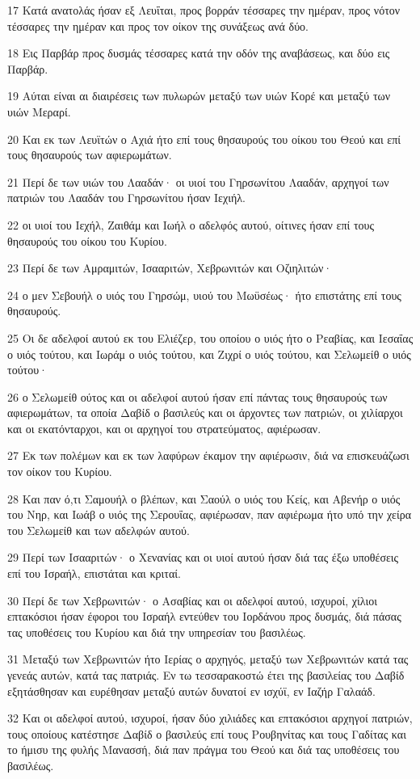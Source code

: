 \par 17 Κατά ανατολάς ήσαν εξ Λευΐται, προς βορράν τέσσαρες την ημέραν, προς νότον τέσσαρες την ημέραν και προς τον οίκον της συνάξεως ανά δύο.
\par 18 Εις Παρβάρ προς δυσμάς τέσσαρες κατά την οδόν της αναβάσεως, και δύο εις Παρβάρ.
\par 19 Αύται είναι αι διαιρέσεις των πυλωρών μεταξύ των υιών Κορέ και μεταξύ των υιών Μεραρί.
\par 20 Και εκ των Λευϊτών ο Αχιά ήτο επί τους θησαυρούς του οίκου του Θεού και επί τους θησαυρούς των αφιερωμάτων.
\par 21 Περί δε των υιών του Λααδάν· οι υιοί του Γηρσωνίτου Λααδάν, αρχηγοί των πατριών του Λααδάν του Γηρσωνίτου ήσαν Ιεχιήλ.
\par 22 οι υιοί του Ιεχήλ, Ζαιθάμ και Ιωήλ ο αδελφός αυτού, οίτινες ήσαν επί τους θησαυρούς του οίκου του Κυρίου.
\par 23 Περί δε των Αμραμιτών, Ισααριτών, Χεβρωνιτών και Οζιηλιτών·
\par 24 ο μεν Σεβουήλ ο υιός του Γηρσώμ, υιού του Μωϋσέως· ήτο επιστάτης επί τους θησαυρούς.
\par 25 Οι δε αδελφοί αυτού εκ του Ελιέζερ, του οποίου ο υιός ήτο ο Ρεαβίας, και Ιεσαΐας ο υιός τούτου, και Ιωράμ ο υιός τούτου, και Ζιχρί ο υιός τούτου, και Σελωμείθ ο υιός τούτου·
\par 26 ο Σελωμείθ ούτος και οι αδελφοί αυτού ήσαν επί πάντας τους θησαυρούς των αφιερωμάτων, τα οποία Δαβίδ ο βασιλεύς και οι άρχοντες των πατριών, οι χιλίαρχοι και οι εκατόνταρχοι, και οι αρχηγοί του στρατεύματος, αφιέρωσαν.
\par 27 Εκ των πολέμων και εκ των λαφύρων έκαμον την αφιέρωσιν, διά να επισκευάζωσι τον οίκον του Κυρίου.
\par 28 Και παν ό,τι Σαμουήλ ο βλέπων, και Σαούλ ο υιός του Κείς, και Αβενήρ ο υιός του Νηρ, και Ιωάβ ο υιός της Σερουΐας, αφιέρωσαν, παν αφιέρωμα ήτο υπό την χείρα του Σελωμείθ και των αδελφών αυτού.
\par 29 Περί των Ισααριτών· ο Χενανίας και οι υιοί αυτού ήσαν διά τας έξω υποθέσεις επί του Ισραήλ, επιστάται και κριταί.
\par 30 Περί δε των Χεβρωνιτών· ο Ασαβίας και οι αδελφοί αυτού, ισχυροί, χίλιοι επτακόσιοι ήσαν έφοροι του Ισραήλ εντεύθεν του Ιορδάνου προς δυσμάς, διά πάσας τας υποθέσεις του Κυρίου και διά την υπηρεσίαν του βασιλέως.
\par 31 Μεταξύ των Χεβρωνιτών ήτο Ιερίας ο αρχηγός, μεταξύ των Χεβρωνιτών κατά τας γενεάς αυτών, κατά τας πατριάς. Εν τω τεσσαρακοστώ έτει της βασιλείας του Δαβίδ εξητάσθησαν και ευρέθησαν μεταξύ αυτών δυνατοί εν ισχύϊ, εν Ιαζήρ Γαλαάδ.
\par 32 Και οι αδελφοί αυτού, ισχυροί, ήσαν δύο χιλιάδες και επτακόσιοι αρχηγοί πατριών, τους οποίους κατέστησε Δαβίδ ο βασιλεύς επί τους Ρουβηνίτας και τους Γαδίτας και το ήμισυ της φυλής Μανασσή, διά παν πράγμα του Θεού και διά τας υποθέσεις του βασιλέως.

